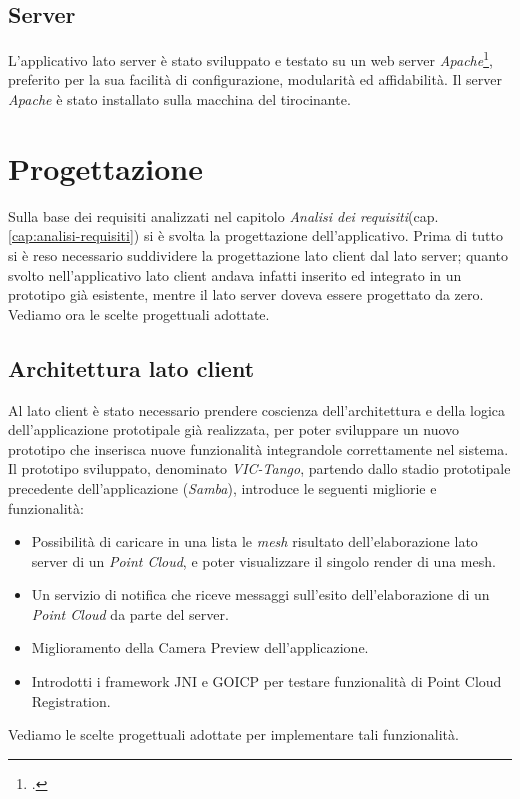 \subsection{Server}
L'applicativo lato server è stato sviluppato e testato su un web server \emph{Apache}\footcite{https://httpd.apache.org/}, preferito per la sua facilità di configurazione, modularità ed affidabilità. Il server \emph{Apache} è stato installato sulla macchina del tirocinante.

\newpage
\section{Progettazione}
\label{sec:progettazione}
Sulla base dei requisiti analizzati nel capitolo \emph{Analisi dei requisiti}(cap. \ref{cap:analisi-requisiti}) si è svolta la progettazione dell'applicativo. Prima di tutto si è reso necessario suddividere la progettazione lato client dal lato server; quanto svolto nell'applicativo lato client andava infatti inserito ed integrato in un prototipo già esistente, mentre il lato server doveva essere progettato da zero.
Vediamo ora le scelte progettuali adottate.

\subsection{Architettura lato client}
Al lato client è stato necessario prendere coscienza dell'architettura e della logica dell'applicazione prototipale già realizzata, per poter sviluppare un nuovo prototipo che inserisca nuove funzionalità integrandole correttamente nel sistema. 
Il prototipo sviluppato, denominato \emph{VIC-Tango}, partendo dallo stadio prototipale precedente dell'applicazione (\emph{Samba}), introduce le seguenti migliorie e funzionalità:
\begin{itemize}
\item Possibilità di caricare in una lista le \emph{mesh} risultato dell'elaborazione lato server di un \emph{Point Cloud}, e poter visualizzare il singolo render di una mesh.
\item Un servizio di notifica che riceve messaggi sull'esito dell'elaborazione di un \emph{Point Cloud} da parte del server.
\item Miglioramento della Camera Preview dell'applicazione.
\item Introdotti i framework JNI e GOICP per testare funzionalità di Point Cloud Registration.
\end{itemize}
Vediamo le scelte progettuali adottate per implementare tali funzionalità.

